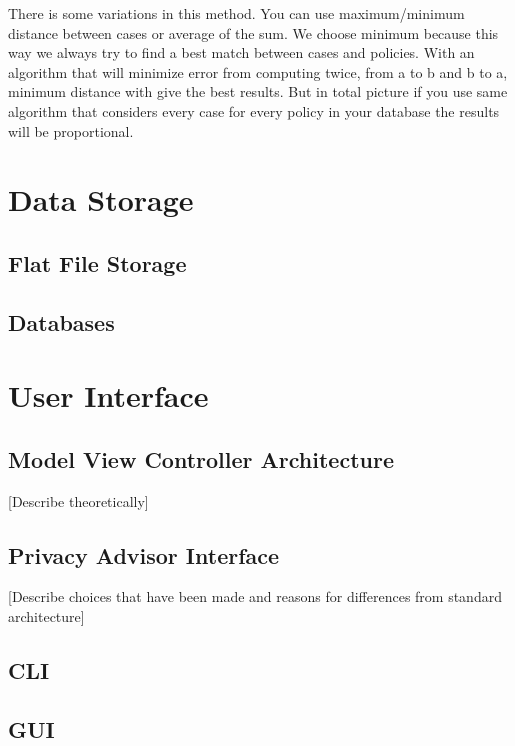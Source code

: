 There is some variations in this method. You can use maximum/minimum distance between cases or average of the sum. We choose minimum because this way we always try to find a best match between cases and policies. With an algorithm that will minimize error from computing twice, from a to b and b to a, minimum distance with give the best results. But in total picture if you use same algorithm that considers every case for every policy in your database the results will be proportional.




\section{Data Storage}


\subsection{Flat File Storage}



\subsection{Databases}

\section{User Interface}

\subsection{Model View Controller Architecture}
[Describe theoretically]

\subsection{Privacy Advisor Interface}
[Describe choices that have been made and reasons for differences from standard architecture]

\subsection{CLI}

\subsection{GUI}